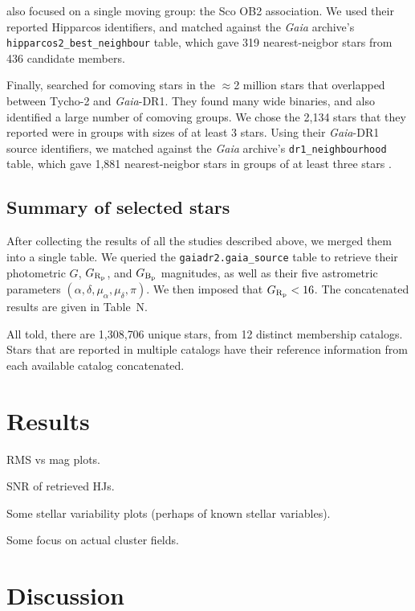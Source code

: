 \documentclass[12pt,twocolumn,tighten]{aastex62}
\begin{document}
\citet{rizzuto_multidimensional_2011} also focused on a single moving
group: the Sco OB2 association. We used their reported Hipparcos
identifiers, and matched against the {\it Gaia} archive's
\texttt{hipparcos2_best_neighbour} table, which gave 319
nearest-neigbor stars from 436 candidate members.

Finally, \citet{oh_comoving_2017} searched for comoving stars in the
$\approx$2 million stars that overlapped between Tycho-2 and {\it
Gaia}-DR1.  They found many wide binaries, and also identified a large
number of comoving groups.  We chose the 2{,}134 stars that they
reported were in groups with sizes of at least 3 stars.  Using their
{\it Gaia}-DR1 source identifiers, we matched against the {\it Gaia}
archive's \texttt{dr1_neighbourhood} table, which gave 1{,}881
nearest-neigbor stars in groups of at least three stars
\citep{marrese_gaia_2019}.

\subsection{Summary of selected stars}

After collecting the results of all the studies described above, we
merged them into a single table. We queried the
\texttt{gaiadr2.gaia_source} table to retrieve their photometric $G$,
$G_{\rm R_p}$, and $G_{\rm B_p}$ magnitudes, as well as their
five astrometric parameters $(\alpha, \delta, \mu_\alpha, \mu_\delta,
\pi)$.
We then imposed that $G_{\rm R_p} < 16$.
The concatenated results are given in Table~N.

All told, there are 1{,}308{,}706 unique stars, from 12 distinct
membership catalogs.
Stars that are reported in multiple catalogs have their reference
information from each available catalog concatenated.





\section{Results}
\label{sec:results}

RMS vs mag plots.

SNR of retrieved HJs.

Some stellar variability plots (perhaps of known stellar variables).

Some focus on actual cluster fields.


\section{Discussion}
\label{sec:discussion}
\end{document}
